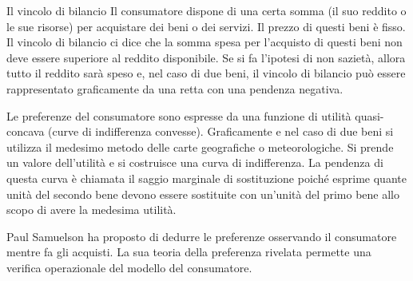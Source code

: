 \begin{description}
 \item {Il vincolo di bilancio}
Il consumatore dispone di una certa somma (il suo reddito o le sue risorse) per 
acquistare dei beni o dei servizi. Il prezzo di questi beni è fisso. Il vincolo 
di bilancio ci dice che la somma spesa per l'acquisto di questi beni non deve 
essere superiore al reddito disponibile. Se si fa l'ipotesi di non sazietà, 
allora tutto il reddito sarà speso e, nel caso di due beni, il vincolo di 
bilancio può essere rappresentato graficamente da una retta con una pendenza 
negativa. 
 \item [Le preferenze]
Le preferenze del consumatore sono espresse da una funzione di utilità 
quasi-concava (curve di indifferenza convesse). 
Graficamente e nel caso di due beni si utilizza il medesimo metodo delle carte 
geografiche o meteorologiche. Si prende un valore dell'utilità e si costruisce 
una curva di indifferenza. La pendenza di questa curva è chiamata il saggio 
marginale di sostituzione poiché esprime quante unità del secondo bene devono 
essere sostituite con un'unità del primo bene allo scopo di avere la medesima 
utilità.


Paul Samuelson ha proposto di dedurre le preferenze osservando il 
consumatore mentre fa gli acquisti. La sua teoria della preferenza rivelata 
permette una verifica operazionale del modello del consumatore.
\end{description}

% 
% 
% 

